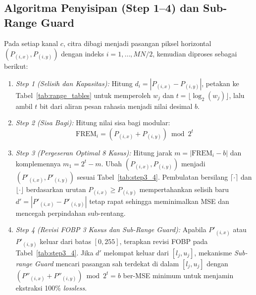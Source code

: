\documentclass[12pt,journal]{IEEEtran}
\begin{document}
\subsection{Algoritma Penyisipan (Step 1--4) dan Sub-Range Guard}
Pada setiap kanal $c$, citra dibagi menjadi pasangan piksel horizontal $(P_{(i,x)}, P_{(i,y)})$ dengan indeks $i = 1, \dots, MN/2$, kemudian diproses sebagai berikut:
\begin{enumerate}
    \item \textit{Step 1 (Selisih dan Kapasitas):} Hitung $d_i = |P_{(i,x)} - P_{(i,y)}|$, petakan ke Tabel~\ref{tab:range_tables} untuk memperoleh $w_j$ dan $t = \lfloor \log_2(w_j) \rfloor$, lalu ambil $t$ bit dari aliran pesan rahasia menjadi nilai desimal $b$.
    \item \textit{Step 2 (Sisa Bagi):} Hitung nilai sisa bagi modular:
    \begin{equation}
    \text{FREM}_i = (P_{(i,x)} + P_{(i,y)}) \bmod 2^t
    \label{eq:frem}
    \end{equation}
    \item \textit{Step 3 (Pergeseran Optimal 8 Kasus):} Hitung jarak $m = |\text{FREM}_i - b|$ dan komplemennya $m_1 = 2^t - m$. Ubah $(P_{(i,x)}, P_{(i,y)})$ menjadi $(P'_{(i,x)}, P'_{(i,y)})$ sesuai Tabel~\ref{tab:step3_4}. Pembulatan bersilang $\lceil \cdot \rceil$ dan $\lfloor \cdot \rfloor$ berdasarkan urutan $P_{(i,x)} \ge P_{(i,y)}$ mempertahankan selisih baru $d' = |P'_{(i,x)} - P'_{(i,y)}|$ tetap rapat sehingga meminimalkan MSE dan mencegah perpindahan sub-rentang.
    \item \textit{Step 4 (Revisi FOBP 3 Kasus dan Sub-Range Guard):} Apabila $P'_{(i,x)}$ atau $P'_{(i,y)}$ keluar dari batas $[0, 255]$, terapkan revisi FOBP pada Tabel~\ref{tab:step3_4}. Jika $d'$ melompat keluar dari $[l_j, u_j]$, mekanisme \textit{Sub-range Guard} mencari pasangan sah terdekat di dalam $[l_j, u_j]$ dengan $(P''_{(i,x)} + P''_{(i,y)}) \bmod 2^t = b$ ber-MSE minimum untuk menjamin ekstraksi 100\% \textit{lossless}.
\end{enumerate}
\end{document}
